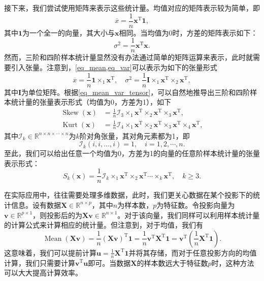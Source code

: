 接下来，我们尝试使用矩阵来表示这些统计量。均值对应的矩阵表示较为简单，即
\begin{equation} \label{eq_mean}
    \overline{x} = \frac{1}{n} \bm{x}^{\mathrm{T}} \bm{1},
\end{equation}
其中\( \bm{1} \)为一个全一的向量，其大小与\( \bm{x} \)相同。当均值为0时，方差的矩阵表示如下：
\begin{equation} \label{eq_var}
    \sigma^2 = \frac{1}{n} \bm{x}^{\mathrm{T}} \bm{x}.
\end{equation}
然而，三阶和四阶样本统计量显然没有办法通过简单的矩阵运算来表示，此时就需要引入张量。注意到，\cref{eq_mean,eq_var}可以表示为如下的张量形式
\begin{equation} \label{eq_mean_var_tensor}
    \overline{x} = \frac{1}{n} \bm{1} \times_1 \bm{x}^{\mathrm{T}}, \quad \sigma^2 = \frac{1}{n} \mathbf{I} \times_1 \bm{x}^{\mathrm{T}} \times_2 \bm{x}^{\mathrm{T}},
\end{equation}
其中\( \mathbf{I} \)为单位矩阵。根据\cref{eq_mean_var_tensor}，可以自然地推导出三阶和四阶样本统计量的张量表示形式（均值为0，方差为1），如下
\begin{equation}
    \begin{split}
        \operatorname{Skew}(\bm{x}) & = \frac{1}{n} \mathcal{I}_3 \times_1 \bm{x}^{\mathrm{T}} \times_2 \bm{x}^{\mathrm{T}} \times_3 \bm{x}^{\mathrm{T}},                              \\
        \operatorname{Kurt}(\bm{x}) & = \frac{1}{n} \mathcal{I}_4 \times_1 \bm{x}^{\mathrm{T}} \times_2 \bm{x}^{\mathrm{T}} \times_3 \bm{x}^{\mathrm{T}} \times_4 \bm{x}^{\mathrm{T}},
    \end{split}
\end{equation}
其中\( \mathcal{I}_k \in \mathbb{R}^{n \times n \times \cdots \times n} \)为\( k \)阶对角张量，其对角元素都为1，即
\[
    \mathcal{I}_k(i, i, \ldots, i) = 1,\quad i = 1, 2, \cdots, n.
\]
至此，我们可以给出任意一个均值为0，方差为1的向量的任意阶样本统计量的张量表示形式：
\begin{equation}
    S_k(\bm{x}) = \frac{1}{n} \mathcal{I}_k \times_1 \bm{x}^{\mathrm{T}} \times_2 \bm{x}^{\mathrm{T}} \cdots \times_k \bm{x}^{\mathrm{T}}, \quad k \geq 3.
\end{equation}

在实际应用中，往往需要处理多维数据，此时，我们更关心数据在某个投影下的统计信息。设有数据\( \mathbf{X} \in \mathbb{R}^{n \times p} \)，其中\( n \)为样本数，\( p \)为特征数。令投影向量为\( \bm{v} \in \mathbb{R}^{p \times 1} \)，则投影后的为\( \mathbf{X} \bm{v} \in \mathbb{R}^{n \times 1} \)。对于该向量，我们同样可以利用样本统计量的计算公式来计算相应的统计量。但注意到，对于均值，我们有
\[
    \operatorname{Mean}(\mathbf{X} \bm{v}) = \frac{1}{n} \left( \mathbf{X} \bm{v} \right)^{\mathrm{T}} \bm{1} = \frac{1}{n} \bm{v}^{\mathrm{T}} \mathbf{X}^{\mathrm{T}} \bm{1} = \bm{v}^{\mathrm{T}} \left( \frac{1}{n} \mathbf{X}^{\mathrm{T}} \bm{1} \right).
\]
这意味着，我们可以提前计算\(\bm{u} =  \frac{1}{n} \mathbf{X}^{\mathrm{T}} \bm{1}\)并将其存储，而对于任意投影方向的均值计算，我们只需要计算\( \bm{v}^{\mathrm{T}} \bm{u} \)即可。当数据\( \mathbf{X} \)的样本数远大于特征数\( p \)时，这种方法可以大大提高计算效率。

